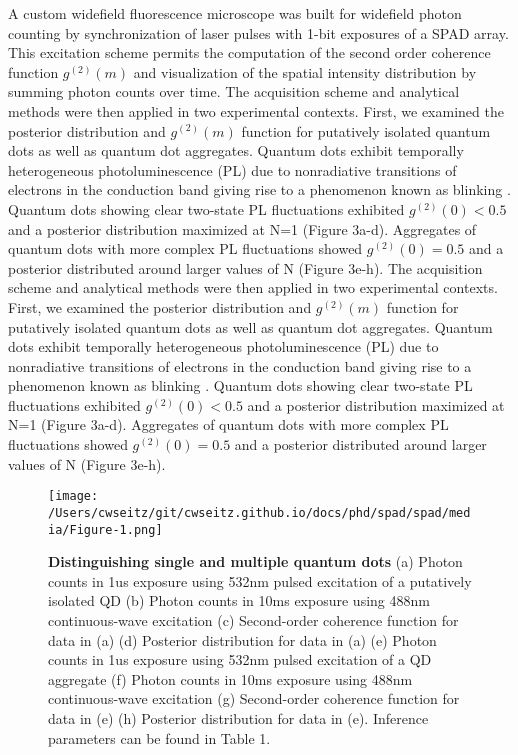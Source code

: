 A custom widefield fluorescence microscope was built for widefield photon counting by synchronization of laser pulses with 1-bit exposures of a SPAD array. This excitation scheme permits the computation of the second order coherence function  $g^{(2)}(m)$ and visualization of the spatial intensity distribution by summing photon counts over time. The acquisition scheme and analytical methods were then applied in two experimental contexts. First, we examined the posterior distribution and $g^{(2)}(m)$ function for putatively isolated quantum dots as well as quantum dot aggregates. Quantum dots exhibit temporally heterogeneous photoluminescence (PL) due to nonradiative transitions of electrons in the conduction band giving rise to a phenomenon known as blinking \parencite{Stoler1985,Furuta2022}. Quantum dots showing clear two-state PL fluctuations exhibited $g^{(2)}(0)<0.5$ and a posterior distribution maximized at N=1 (Figure 3a-d). Aggregates of quantum dots with more complex PL fluctuations showed $g^{(2)}(0)=0.5$ and a posterior distributed around larger values of N (Figure 3e-h). The acquisition scheme and analytical methods were then applied in two experimental contexts. First, we examined the posterior distribution and $g^{(2)}(m)$ function for putatively isolated quantum dots as well as quantum dot aggregates. Quantum dots exhibit temporally heterogeneous photoluminescence (PL) due to nonradiative transitions of electrons in the conduction band giving rise to a phenomenon known as blinking \parencite{Furuta2022,Efros2016}. Quantum dots showing clear two-state PL fluctuations exhibited $g^{(2)}(0)<0.5$ and a posterior distribution maximized at N=1 (Figure 3a-d). Aggregates of quantum dots with more complex PL fluctuations showed $g^{(2)}(0)=0.5$ and a posterior distributed around larger values of N (Figure 3e-h).

\begin{figure}
\centering
\texttt{[image: /Users/cwseitz/git/cwseitz.github.io/docs/phd/spad/spad/media/Figure-1.png]}
\caption{\textbf{Distinguishing single and multiple quantum dots} (a) Photon counts in 1us exposure using 532nm pulsed excitation of a putatively isolated QD (b) Photon counts in 10ms exposure using 488nm continuous-wave excitation (c) Second-order coherence function for data in (a) (d) Posterior distribution for data in (a) (e) Photon counts in 1us exposure using 532nm pulsed excitation of a QD aggregate (f) Photon counts in 10ms exposure using 488nm continuous-wave excitation (g) Second-order coherence function for data in (e) (h) Posterior distribution for data in (e). Inference parameters can be found in Table 1.}
\label{fig:qdagg}
\end{figure}  

